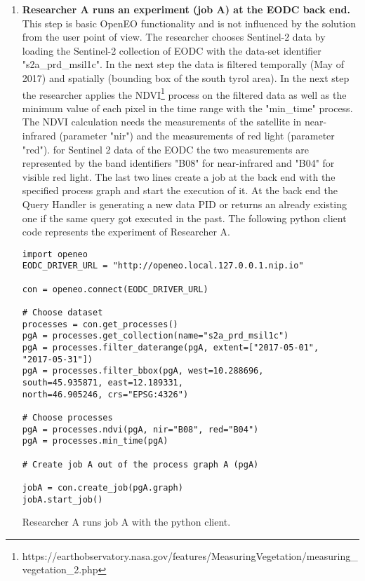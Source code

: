 \documentclass[draft,final]{vutinfth} %
\newenvironment{code}{\captionsetup{type=listing}}{}
\begin{document}
\begin{enumerate}
	\item \textbf{Researcher A runs an experiment (job A) at the EODC back end.} \\
	This step is basic OpenEO functionality and is not influenced by the solution from the user point of view. The researcher chooses Sentinel-2 data by loading the Sentinel-2 collection of EODC with the data-set identifier "s2a\_prd\_msil1c". In the next step the data is filtered temporally (May of 2017) and spatially (bounding box of the south tyrol area). In the next step the researcher applies the NDVI\footnote{https://earthobservatory.nasa.gov/features/MeasuringVegetation/measuring\_vegetation\_2.php} process on the filtered data as well as the minimum value of each pixel in the time range with the "min\_time" process. The NDVI calculation needs the measurements of the satellite in near-infrared (parameter "nir") and the measurements of red light (parameter "red"). for Sentinel 2 data of the EODC the two measurements are represented by the band identifiers "B08" for near-infrared and "B04" for visible red light. The last two lines create a job at the back end with the specified process graph and start the execution of it.
	At the back end the Query Handler is generating a new data PID or returns an already existing one if the same query got executed in the past. The following python client code represents the experiment of Researcher A.
	
\begin{code}
	\begin{verbatim}
import openeo
EODC_DRIVER_URL = "http://openeo.local.127.0.0.1.nip.io"

con = openeo.connect(EODC_DRIVER_URL)

# Choose dataset
processes = con.get_processes()
pgA = processes.get_collection(name="s2a_prd_msil1c")
pgA = processes.filter_daterange(pgA, extent=["2017-05-01", 
"2017-05-31"])
pgA = processes.filter_bbox(pgA, west=10.288696, 
south=45.935871, east=12.189331, 
north=46.905246, crs="EPSG:4326")

# Choose processes
pgA = processes.ndvi(pgA, nir="B08", red="B04")
pgA = processes.min_time(pgA)

# Create job A out of the process graph A (pgA)

jobA = con.create_job(pgA.graph)
jobA.start_job()
	\end{verbatim}
	\caption{Researcher A runs job A with the python client.}
	\label{lst:impl_usecase1_1}
\end{code}	


\end{enumerate}
\end{document}
